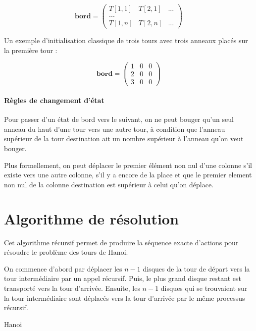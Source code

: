 $$
\mathbf{bord} = 
\begin{pmatrix}
    T[1, 1] & T[2, 1] & ... \\
    ... \\
    T[1, n] & T[2, n] & ...
\end{pmatrix}$$

Un exemple d'initialisation classique de trois tours avec trois anneaux placés sur la première tour :

$$
\mathbf{bord} = 
\begin{pmatrix}
    1 & 0 & 0 \\
    2 & 0 & 0 \\
    3 & 0 & 0 
\end{pmatrix}
$$

\paragraph{Règles de changement d'état}
Pour passer d'un état de bord vers le suivant, on ne peut bouger qu'un seul anneau du haut d'une tour vers une autre tour, à condition que l'anneau supérieur de la tour destination ait un nombre supérieur à l'anneau qu'on veut bouger.
\par
Plus formellement, on peut déplacer le premier élément non nul d'une colonne s'il existe vers une autre colonne, s'il y a encore de la place et que le premier element non nul de la colonne destination est supérieur à celui qu'on déplace.

\section{Algorithme de résolution}
Cet algorithme récursif permet de produire la séquence exacte d'actions pour résoudre le problème des tours de Hanoi.
\par
On commence d'abord par déplacer les $n - 1$ disques de la tour de départ vers la tour intermédiaire par un appel récursif. Puis, le plus grand disque restant est transporté vers la tour d'arrivée. Ensuite, les $n - 1$ disques qui se trouvaient sur la tour intermédiaire sont déplacés vers la tour d'arrivée par le même processus récursif.

\begin{algorithm}[H]
    \SetAlgoLined
    \caption{Hanoi}
\end{algorithm}


